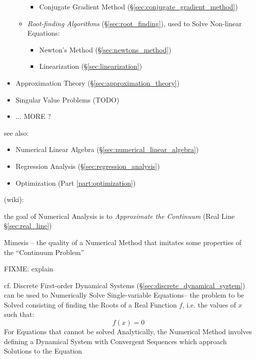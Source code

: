 \begin{itemize}
\begin{itemize}
\begin{itemize}
          \item Conjugate Gradient Method
            (\S\ref{sec:conjugate_gradient_method})
        \end{itemize}
      \item \emph{Root-finding Algorithms} (\S\ref{sec:root_finding}), used to
        Solve Non-linear Equations:
        \begin{itemize}
          \item Newton's Method (\S\ref{sec:newtons_method})
          \item Linearization (\S\ref{sec:linearization})
        \end{itemize}
    \end{itemize}
  \item Approximation Theory (\S\ref{sec:approximation_theory})
  \item Singular Value Problems (TODO)
  \item ... MORE ?
\end{itemize}

see also:
\begin{itemize}
  \item Numerical Linear Algebra (\S\ref{sec:numerical_linear_algebra})
  \item Regression Analysis (\S\ref{sec:regression_analysis})
  \item Optimization (Part \ref{part:optimization})
\end{itemize}

(wiki):

the goal of Numerical Analysis is to \emph{Approximate the Continuum}
(Real Line \S\ref{sec:real_line})

Mimesis -- the quality of a Numerical Method that imitates some properties of
the ``Continuum Problem''

FIXME: explain

\asterism

\fist cf. Discrete First-order Dynamical Systems
(\S\ref{sec:discrete_dynamical_system}) can be used to Numerically Solve
Single-variable Equations-- the problem to be Solved consisting of finding the
Roots of a Real Function $f$, i.e. the values of $x$ such that:
\[
  f(x) = 0
\]
For Equations that cannot be solved Analytically, the Numerical Method involves
defining a Dynamical System with Convergent Sequences which approach Solutions
to the Equation



